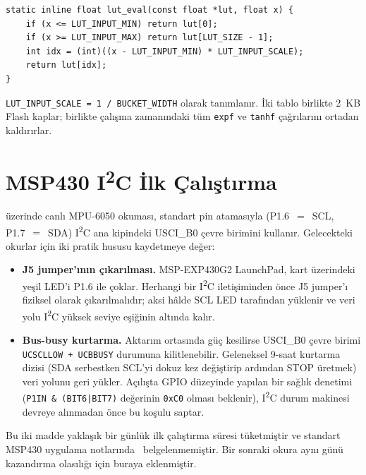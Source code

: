 \begin{verbatim}
static inline float lut_eval(const float *lut, float x) {
    if (x <= LUT_INPUT_MIN) return lut[0];
    if (x >= LUT_INPUT_MAX) return lut[LUT_SIZE - 1];
    int idx = (int)((x - LUT_INPUT_MIN) * LUT_INPUT_SCALE);
    return lut[idx];
}
\end{verbatim}

\texttt{LUT\_INPUT\_SCALE = 1 / BUCKET\_WIDTH} olarak tanımlanır.
İki tablo birlikte 2~KB Flash kaplar; birlikte çalışma zamanındaki
tüm \texttt{expf} ve \texttt{tanhf} çağrılarını ortadan kaldırırlar.

\section{MSP430 \texorpdfstring{I\textsuperscript{2}C}{I2C} İlk Çalıştırma}
\label{app:hw}

\msp{} üzerinde canlı MPU-6050 okuması, standart pin atamasıyla
(P1.6~$=$~SCL, P1.7~$=$~SDA) I\textsuperscript{2}C ana kipindeki
USCI\_B0 çevre birimini kullanır. Gelecekteki okurlar için iki
pratik hususu kaydetmeye değer:

\begin{itemize}
\item \textbf{J5 jumper'ının çıkarılması.} MSP-EXP430G2 LaunchPad,
kart üzerindeki yeşil LED'i P1.6 ile çoklar. Herhangi bir
I\textsuperscript{2}C iletişiminden önce J5 jumper'ı fiziksel
olarak çıkarılmalıdır; aksi hâlde SCL LED tarafından yüklenir ve
veri yolu I\textsuperscript{2}C yüksek seviye eşiğinin altında kalır.

\item \textbf{Bus-busy kurtarma.} Aktarım ortasında güç kesilirse
USCI\_B0 çevre birimi \texttt{UCSCLLOW + UCBBUSY} durumuna
kilitlenebilir. Geleneksel 9-saat kurtarma dizisi (SDA serbestken
SCL'yi dokuz kez değiştirip ardından STOP üretmek) veri yolunu
geri yükler. Açılışta GPIO düzeyinde yapılan bir sağlık denetimi
(\texttt{P1IN \& (BIT6|BIT7)} değerinin \texttt{0xC0} olması
beklenir), I\textsuperscript{2}C durum makinesi devreye alınmadan
önce bu koşulu saptar.
\end{itemize}

Bu iki madde yaklaşık bir günlük ilk çalıştırma süresi tüketmiştir
ve standart MSP430 uygulama notlarında~\cite{ti_msp430}
belgelenmemiştir. Bir sonraki okura aynı günü kazandırma olasılığı
için buraya eklenmiştir.
